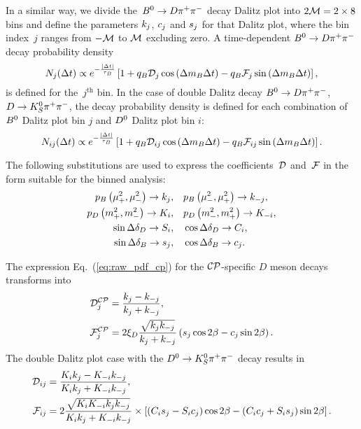 \documentclass[a4paper,11pt]{article}
\begin{document}
In a similar way, we divide the~$B^0\to D\pi^+\pi^-$ decay Dalitz plot into 
$2\mathcal{M}=2\times8$ bins and define the parameters $k_j$, $c_j$ and $s_j$ 
for that Dalitz plot, where the bin index~$j$ ranges from $-\mathcal{M}$ to 
$\mathcal{M}$ excluding zero.  A time-dependent $B^0\to D\pi^+\pi^-$ decay probability density
\begin{equation}\label{eq:binned_pdf}
 N_{j}(\Delta t) \propto e^{-\frac{\left|\Delta t\right|}{\tau_B}}  \left[1 + q_B\mathcal{D}_{j}\cos{\left(\Delta m_B\Delta t\right)}-
                                     q_B\mathcal{F}_{j}\sin{\left(\Delta m_B\Delta t\right)}\right],
\end{equation}
is defined for the~$j^{\textrm{th}}$ bin.  In the case of double Dalitz decay
$B^0\to D\pi^+\pi^-$, $D\to K_S^0\pi^+\pi^-$, the decay probability density is defined for each combination 
of $B^0$ Dalitz plot bin $j$ and $D^0$ Dalitz plot bin $i$:
\begin{equation}\label{eq:double_binned_pdf}
 N_{ij}(\Delta t) \propto e^{-\frac{\left|\Delta t\right|}{\tau_B}} \left[1 + q_B\mathcal{D}_{ij}\cos{\left(\Delta m_B\Delta t\right)}-
                                     q_B\mathcal{F}_{ij}\sin{\left(\Delta m_B\Delta t\right)}\right].
\end{equation}

The following substitutions are used to express the coefficients~$\mathcal{D}$ 
and~$\mathcal{F}$ in the form suitable for the binned analysis:
\begin{subequations}
 \begin{align}
  p_B\left(\mu^2_{+},\mu^2_{-}\right) \to k_j,&\quad p_B\left(\mu^2_{-},\mu^2_{+}\right) \to k_{-j},\\
  p_D\left(m_+^2,m_-^2\right) \to K_i,&\quad p_D\left(m_-^2,m_+^2\right) \to K_{-i},\\
  \sin{\Delta\delta_D} \to S_i,&\quad \cos{\Delta\delta_D} \to C_i,\\
  \sin{\Delta\delta_B} \to s_j,&\quad \cos{\Delta\delta_B} \to c_j.
 \end{align}
\end{subequations}

The expression Eq.~(\ref{eq:raw_pdf_cp}) for the $\mathcal{CP}$-specific $D$ meson 
decays transforms into
\begin{subequations}\label{eq:cp_pdf}
\begin{align}
 \mathcal{D}^{\mathcal{CP}}_j & = \frac{k_j-k_{-j}}{k_j+k_{-j}},\\
 \mathcal{F}^{\mathcal{CP}}_j & = 2\xi_D\frac{\sqrt{k_jk_{-j}}}{k_j+k_{-j}}\left(s_j\cos{2\beta}-
                                                       c_j\sin{2\beta}\right).
\end{align}
\end{subequations}
The double Dalitz plot case with the $D^0 \to K_S^0\pi^+\pi^-$ decay results in
\begin{subequations}\label{eq:dd_pdf}
\begin{align}
 \mathcal{D}_{ij} & = \frac{K_ik_j-K_{-i}k_{-j}}{K_ik_j+K_{-i}k_{-j}},\\
 \mathcal{F}_{ij} & = 2\frac{\sqrt{K_iK_{-i}k_jk_{-j}}}{K_ik_j+K_{-i}k_{-j}}
           \times \left[\left(C_is_j-S_ic_j\right)\cos{2\beta}-
                        \left(C_ic_j+S_is_j\right)\sin{2\beta}\right].
\end{align}
\end{subequations}
\end{document}

